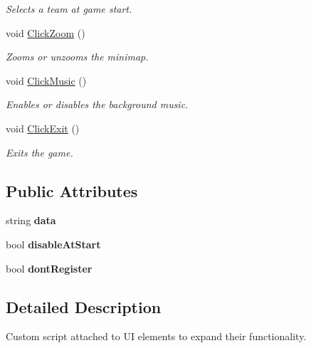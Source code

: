 \begin{DoxyCompactItemize}
\begin{DoxyCompactList}\small\item\em Selects a team at game start. \end{DoxyCompactList}\item 
void \hyperlink{class_custom_u_i_a04b8f13155278afcb5c1aae713a44946}{Click\+Zoom} ()
\begin{DoxyCompactList}\small\item\em Zooms or unzooms the minimap. \end{DoxyCompactList}\item 
void \hyperlink{class_custom_u_i_a76a668ab3db47aa2c48c453e0aa5c715}{Click\+Music} ()
\begin{DoxyCompactList}\small\item\em Enables or disables the background music. \end{DoxyCompactList}\item 
void \hyperlink{class_custom_u_i_a62fdb93fa72df0f82f234ac5f3d6f289}{Click\+Exit} ()
\begin{DoxyCompactList}\small\item\em Exits the game. \end{DoxyCompactList}\end{DoxyCompactItemize}
\subsection*{Public Attributes}
\begin{DoxyCompactItemize}
\item 
\hypertarget{class_custom_u_i_ab09de00d3ba1b1691210c3c37a174420}{}string {\bfseries data}\label{class_custom_u_i_ab09de00d3ba1b1691210c3c37a174420}

\item 
\hypertarget{class_custom_u_i_adc501f5aa6c31200a497460220e41daa}{}bool {\bfseries disable\+At\+Start}\label{class_custom_u_i_adc501f5aa6c31200a497460220e41daa}

\item 
\hypertarget{class_custom_u_i_ad83295715ef4c2108389f9a92dd2f1e0}{}bool {\bfseries dont\+Register}\label{class_custom_u_i_ad83295715ef4c2108389f9a92dd2f1e0}

\end{DoxyCompactItemize}


\subsection{Detailed Description}
Custom script attached to U\+I elements to expand their functionality. 




